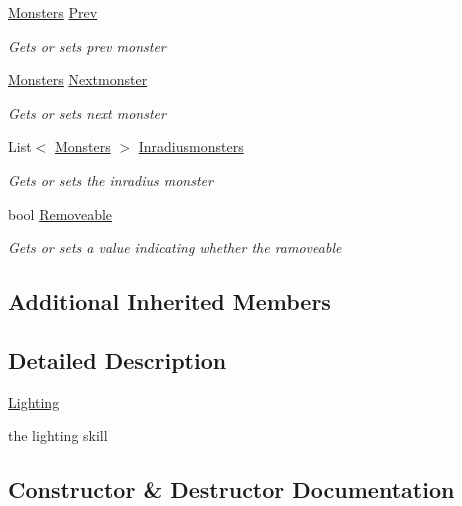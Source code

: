 \begin{DoxyCompactItemize}
\hyperlink{class_lightdeath_1_1_monsters}{Monsters} \hyperlink{class_lightdeath_1_1_lighting_a09a9936b710638b0e4d0f39fb3c6361e}{Prev}
\begin{DoxyCompactList}\small\item\em Gets or sets prev monster \end{DoxyCompactList}\item 
\hyperlink{class_lightdeath_1_1_monsters}{Monsters} \hyperlink{class_lightdeath_1_1_lighting_a8c9100512d19df6f9db0dfc49d5398c5}{Nextmonster}
\begin{DoxyCompactList}\small\item\em Gets or sets next monster \end{DoxyCompactList}\item 
List$<$ \hyperlink{class_lightdeath_1_1_monsters}{Monsters} $>$ \hyperlink{class_lightdeath_1_1_lighting_afddbf150e79c46941e5c563126725464}{Inradiusmonsters}
\begin{DoxyCompactList}\small\item\em Gets or sets the inradius monster \end{DoxyCompactList}\item 
bool \hyperlink{class_lightdeath_1_1_lighting_afee12b3ca02edeba58f4a0e6af6fe0c6}{Removeable}
\begin{DoxyCompactList}\small\item\em Gets or sets a value indicating whether the ramoveable \end{DoxyCompactList}\end{DoxyCompactItemize}
\subsection*{Additional Inherited Members}


\subsection{Detailed Description}
\hyperlink{class_lightdeath_1_1_lighting}{Lighting} 

the lighting skill 

\subsection{Constructor \& Destructor Documentation}
\hypertarget{class_lightdeath_1_1_lighting_a8993a66b1189dc7783ebbaeb24fbf96b}{}\label{class_lightdeath_1_1_lighting_a8993a66b1189dc7783ebbaeb24fbf96b} 
